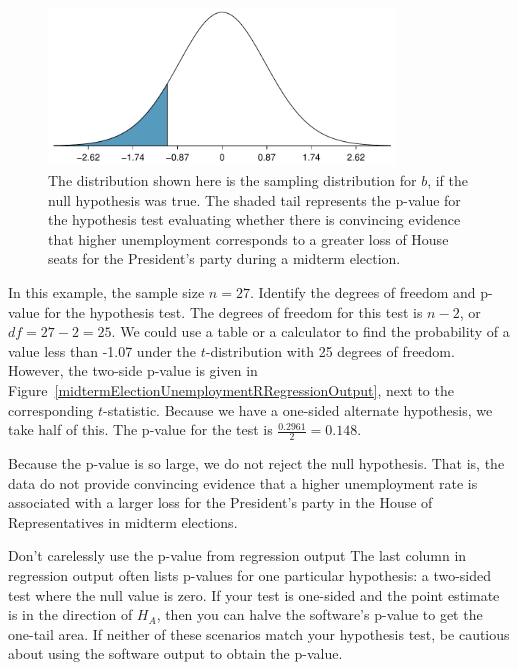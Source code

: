 \begin{figure}
\centering
\includegraphics[width=0.82\textwidth]{ch_regr_simple_linear/figures/oneSidedTailForMidtermUnemploymentHT/oneSidedTailForMidtermUnemploymentHT}
\caption{The distribution shown here is the sampling distribution for $b$, if the null hypothesis was true. The shaded tail represents the p-value for the hypothesis test evaluating whether there is convincing evidence that higher unemployment corresponds to a greater loss of House seats for the President's party during a midterm election.}
\label{oneSidedTailForMidtermUnemploymentHT}
\end{figure}

\begin{examplewrap}
\begin{nexample}{In this example, the sample size $n=27$. Identify the degrees of freedom and p-value for the hypothesis test.}
The degrees of freedom for this test is $n-2$, or $df = 27-2 = 25$. We could use a table or a calculator to find the probability of a value less than -1.07 under the $t$-distribution with 25 degrees of freedom.  However, the two-side p-value is given in Figure~\ref{midtermElectionUnemploymentRRegressionOutput}, next to the corresponding $t$-statistic.  Because we have a one-sided alternate hypothesis, we take half of this.  The p-value for the test is $\frac{0.2961}{2}=0.148$.  
\end{nexample}
\end{examplewrap}

\D{\newpage}

Because the p-value is so large, we do not reject the null hypothesis. That is, the data do not provide convincing evidence that a higher unemployment rate is associated with a larger loss for the President's party in the House of Representatives in midterm elections.


\begin{onebox}{Don't carelessly use the p-value from regression output}
{The last column in regression output often lists p-values for one particular hypothesis: a two-sided test where the null value is zero. If your test is one-sided and the point estimate is in the direction of $H_A$, then you can halve the software's p-value to get the one-tail area. If neither of these scenarios match your hypothesis test, be cautious about using the software output to obtain the p-value.}
\end{onebox}




